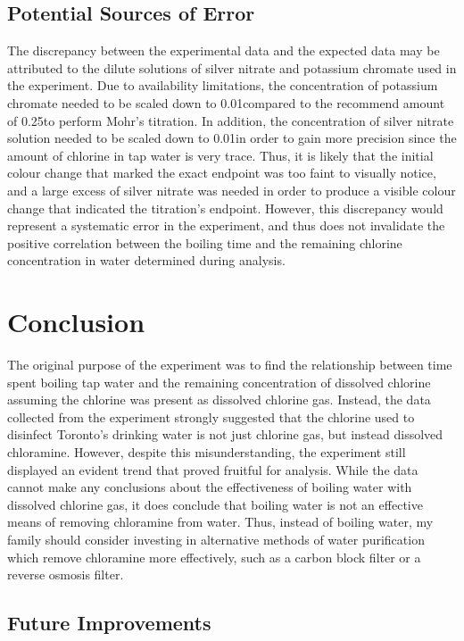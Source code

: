 \documentclass[11pt]{article}
\begin{document}
\subsection{Potential Sources of Error}

The discrepancy between the experimental data and the expected data may be attributed to the dilute solutions of silver nitrate and potassium chromate used in the experiment. Due to availability limitations, the concentration of potassium chromate needed to be scaled down to 0.01\mpl compared to the recommend amount of 0.25\mpl to perform Mohr's titration. In addition, the concentration of silver nitrate solution needed to be scaled down to 0.01\mpl in order to gain more precision since the amount of chlorine in tap water is very trace. Thus, it is likely that the initial colour change that marked the exact endpoint was too faint to visually notice, and a large excess of silver nitrate was needed in order to produce a visible colour change that indicated the titration's endpoint. However, this discrepancy would represent a systematic error in the experiment, and thus does not invalidate the positive correlation between the boiling time and the remaining chlorine concentration in water determined during analysis.

\section{Conclusion}

The original purpose of the experiment was to find the relationship between time spent boiling tap water and the remaining concentration of dissolved chlorine assuming the chlorine was present as dissolved chlorine gas. Instead, the data collected from the experiment strongly suggested that the chlorine used to disinfect Toronto's drinking water is not just chlorine gas, but instead dissolved chloramine. However, despite this misunderstanding, the experiment still displayed an evident trend that proved fruitful for analysis. While the data cannot make any conclusions about the effectiveness of boiling water with dissolved chlorine gas, it does conclude that boiling water is not an effective means of removing chloramine from water. Thus, instead of boiling water, my family should consider investing in alternative methods of water purification which remove chloramine more effectively, such as a carbon block filter or a reverse osmosis filter.

\subsection{Future Improvements}
\end{document}
